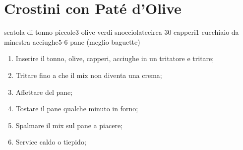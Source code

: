 \section{Crostini con Paté d'Olive}

\generalRecipeInfos{}

\ingredienti%
    {scatola di tonno piccole}{3}%
    {olive verdi snocciolate}{circa 30}%
    {capperi}{1 cucchiaio da minestra}%
    {acciughe}{5-6}%
    {pane (meglio baguette)}{\qb{}}

\begin{enumerate}
    \item Inserire il tonno, olive, capperi, acciughe in un tritatore e tritare;
    \item Tritare fino a che il mix non diventa una crema;
    \item Affettare del pane;
    \item Tostare il pane qualche minuto in forno;
    \item Spalmare il mix sul pane a piacere;
    \item Service caldo o tiepido;
\end{enumerate}

